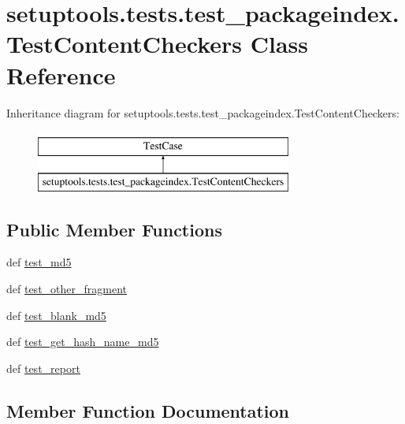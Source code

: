 \hypertarget{classsetuptools_1_1tests_1_1test__packageindex_1_1TestContentCheckers}{}\section{setuptools.\+tests.\+test\+\_\+packageindex.\+Test\+Content\+Checkers Class Reference}
\label{classsetuptools_1_1tests_1_1test__packageindex_1_1TestContentCheckers}
Inheritance diagram for setuptools.\+tests.\+test\+\_\+packageindex.\+Test\+Content\+Checkers\+:\begin{figure}[H]
\begin{center}
\leavevmode
\includegraphics[height=2.000000cm]{classsetuptools_1_1tests_1_1test__packageindex_1_1TestContentCheckers}
\end{center}
\end{figure}
\subsection*{Public Member Functions}
\begin{DoxyCompactItemize}
\item 
def \hyperlink{classsetuptools_1_1tests_1_1test__packageindex_1_1TestContentCheckers_a63eb969926b6662b4b26c493d521da56}{test\+\_\+md5}
\item 
def \hyperlink{classsetuptools_1_1tests_1_1test__packageindex_1_1TestContentCheckers_aa56937c7470f0ec844cd5327686fd72e}{test\+\_\+other\+\_\+fragment}
\item 
def \hyperlink{classsetuptools_1_1tests_1_1test__packageindex_1_1TestContentCheckers_aeb268eb7a342c6ffa66a4e33f75f0cd0}{test\+\_\+blank\+\_\+md5}
\item 
def \hyperlink{classsetuptools_1_1tests_1_1test__packageindex_1_1TestContentCheckers_a424ee4f74bc0f9a11b6c46e7703f9879}{test\+\_\+get\+\_\+hash\+\_\+name\+\_\+md5}
\item 
def \hyperlink{classsetuptools_1_1tests_1_1test__packageindex_1_1TestContentCheckers_a9dc8b71145ddd4c92c5e7262d5ef62d5}{test\+\_\+report}
\end{DoxyCompactItemize}


\subsection{Member Function Documentation}
\hypertarget{classsetuptools_1_1tests_1_1test__packageindex_1_1TestContentCheckers_aeb268eb7a342c6ffa66a4e33f75f0cd0}{}
